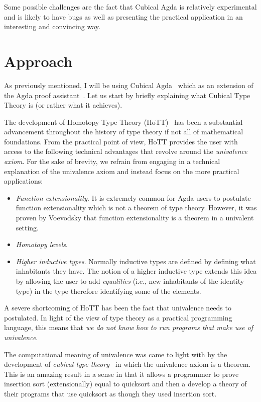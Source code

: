 \documentclass{article}
\begin{document}
Some possible challenges are the fact that Cubical Agda is relatively experimental and is
likely to have bugs as well as presenting the practical application in an interesting and
convincing way.

\section{Approach}

As previously mentioned, I will be using Cubical Agda~\cite{cubicalagda} which as an
extension of the Agda proof assistant~\cite{norell:2008}. Let us start by briefly
explaining what Cubical Type Theory is (or rather what it achieves).

The development of Homotopy Type Theory (HoTT)~\cite{hottbook} has been a substantial
advancement throughout the history of type theory if not all of mathematical foundations.
From the practical point of view, HoTT provides the user with access to the following
technical advantages that revolve around the \emph{univalence axiom}. For the sake of
brevity, we refrain from engaging in a technical explanation of the univalence axiom and
instead focus on the more practical applications:

\begin{itemize}
  \item \emph{Function extensionality}. It is extremely common for Agda users to postulate
    function extensionality which is not a theorem of type theory. However, it was proven
    by Voevodsky that function extensionality is a theorem in a univalent setting.
  \item \emph{Homotopy levels}.
  \item \emph{Higher inductive types}. Normally inductive types are defined by defining
    what inhabitants they have. The notion of a higher inductive type extends this idea by
    allowing the user to add \emph{equalities} (i.e., new inhabitants of the identity
    type) in the type therefore identifying some of the elements.
\end{itemize}

A severe shortcoming of HoTT has been the fact that univalence needs to postulated. In
light of the view of type theory as a practical programming language, this means that
\emph{we do not know how to run programs that make use of univalence}.

The computational meaning of univalence was came to light with by the development of
\emph{cubical type theory}~\cite{cubicaltt} in which the univalence axiom is a theorem.
This is an amazing result in a sense in that it allows a programmer to prove insertion
sort (extensionally) equal to quicksort and then a develop a theory of their programs that
use quicksort as though they used insertion sort.



\end{document}

